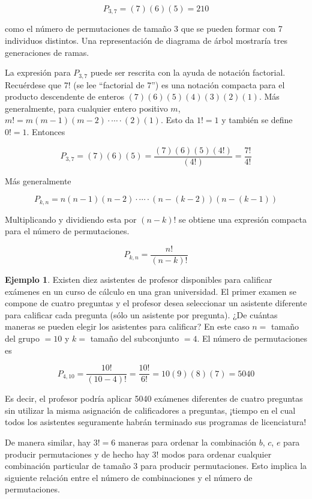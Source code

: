 \documentclass[
  11pt,
]{book}
\theoremstyle{definition}
\theoremstyle{definition}
\newtheorem{example}{Ejemplo}[chapter]
\theoremstyle{definition}
\theoremstyle{definition}
\theoremstyle{remark}
\begin{document}
\[
P_{3,7} = (7)(6)(5) = 210
\]

como el número de permutaciones de tamaño 3 que se pueden formar con 7 individuos distintos. Una representación de diagrama de árbol mostraría tres generaciones de ramas.

La expresión para \(P_{3,7}\) puede ser rescrita con la ayuda de notación factorial. Recuérdese que 7! (se lee ``factorial de 7'') es una notación compacta para el producto descendente de enteros \((7)(6)(5)(4)(3)(2)(1)\). Más generalmente, para cualquier entero positivo \(m\), \(m! = m(m-1)(m-2)\cdot\cdots\cdot(2)(1)\). Esto da \(1! = 1\) y también se define \(0! = 1\). Entonces

\[
P_{3,7} = (7)(6)(5) = \frac{(7)(6)(5)(4!)}{(4!)} = \frac{7!}{4!}
\]

Más generalmente

\[
P_{k,n} = n(n-1)(n-2)\cdot\cdots\cdot(n-(k-2))(n-(k-1))
\]

Multiplicando y dividiendo esta por \((n-k)!\) se obtiene una expresión compacta para el número de permutaciones.

\begin{equation}
P_{k,n} = \frac{n!}{(n-k)!}
\label{eq:permutaciones}
\end{equation}

\begin{example}
Existen diez asistentes de profesor disponibles para calificar exámenes en un curso de cálculo en una gran universidad. El primer examen se compone de cuatro preguntas y el profesor desea seleccionar un asistente diferente para calificar cada pregunta (sólo un asistente por pregunta). ¿De cuántas maneras se pueden elegir los asistentes para calificar? En este caso \(n =\) tamaño del grupo \(= 10\) y \(k =\) tamaño del subconjunto \(= 4\). El número de permutaciones es

\[
P_{4,10} = \frac{10!}{(10-4)!} = \frac{10!}{6!} = 10(9)(8)(7) = 5040
\]

Es decir, el profesor podría aplicar 5040 exámenes diferentes de cuatro preguntas sin utilizar la misma asignación de calificadores a preguntas, ¡tiempo en el cual todos los asistentes seguramente habrán terminado sus programas de licenciatura!
\end{example}

De manera similar, hay \(3! = 6\) maneras para ordenar la combinación \(b\), \(c\), \(e\) para producir permutaciones y de hecho hay 3! modos para ordenar cualquier combinación particular de tamaño 3 para producir permutaciones. Esto implica la siguiente relación entre el número de combinaciones y el número de permutaciones.
\end{document}
